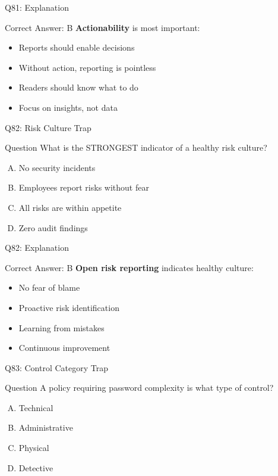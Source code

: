 \documentclass{beamer}
\begin{document}
	\begin{frame}{Q81: Explanation}
		\begin{block}{Correct Answer: B}
			\textbf{Actionability} is most important:
			\begin{itemize}
				\item Reports should enable decisions
				\item Without action, reporting is pointless
				\item Readers should know what to do
				\item Focus on insights, not data
			\end{itemize}
		\end{block}
	\end{frame}
	
	\begin{frame}{Q82: Risk Culture Trap}
		\begin{block}{Question}
			What is the STRONGEST indicator of a healthy risk culture?
		\end{block}
		\begin{enumerate}[(A)]
			\item No security incidents
			\item Employees report risks without fear
			\item All risks are within appetite
			\item Zero audit findings
		\end{enumerate}
	\end{frame}
	
	\begin{frame}{Q82: Explanation}
		\begin{block}{Correct Answer: B}
			\textbf{Open risk reporting} indicates healthy culture:
			\begin{itemize}
				\item No fear of blame
				\item Proactive risk identification
				\item Learning from mistakes
				\item Continuous improvement
			\end{itemize}
		\end{block}
	\end{frame}
	
	\begin{frame}{Q83: Control Category Trap}
		\begin{block}{Question}
			A policy requiring password complexity is what type of control?
		\end{block}
		\begin{enumerate}[(A)]
			\item Technical
			\item Administrative
			\item Physical
			\item Detective
		\end{enumerate}
	\end{frame}
	
\end{document}
